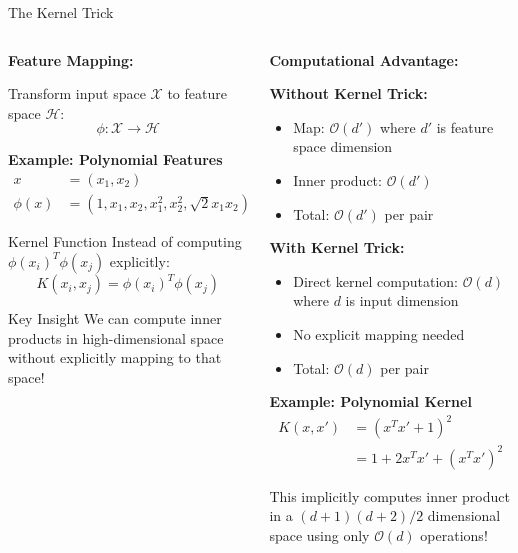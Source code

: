 \documentclass[8pt,aspectratio=1610]{beamer}
\begin{document}
\begin{frame}{The Kernel Trick}
\begin{columns}[t]
\begin{column}{0.48\textwidth}
\textbf{Feature Mapping:}
\vspace{0.2cm}

Transform input space $\mathcal{X}$ to feature space $\mathcal{H}$:
$$\phi: \mathcal{X} \rightarrow \mathcal{H}$$

\vspace{0.3cm}
\textbf{Example: Polynomial Features}
\begin{align}
x &= (x_1, x_2) \\
\phi(x) &= (1, x_1, x_2, x_1^2, x_2^2, \sqrt{2}x_1 x_2)
\end{align}

\vspace{0.3cm}
\begin{block}{Kernel Function}
Instead of computing $\phi(x_i)^T \phi(x_j)$ explicitly:
$$K(x_i, x_j) = \phi(x_i)^T \phi(x_j)$$
\end{block}

\vspace{0.3cm}
\begin{alertblock}{Key Insight}
We can compute inner products in high-dimensional space without explicitly mapping to that space!
\end{alertblock}
\end{column}

\begin{column}{0.48\textwidth}
\textbf{Computational Advantage:}
\vspace{0.2cm}

\textbf{Without Kernel Trick:}
\begin{itemize}
\setlength{\itemsep}{1pt}
\item Map: $\mathcal{O}(d')$ where $d'$ is feature space dimension
\item Inner product: $\mathcal{O}(d')$
\item Total: $\mathcal{O}(d')$ per pair
\end{itemize}

\vspace{0.3cm}
\textbf{With Kernel Trick:}
\begin{itemize}
\setlength{\itemsep}{1pt}
\item Direct kernel computation: $\mathcal{O}(d)$ where $d$ is input dimension
\item No explicit mapping needed
\item Total: $\mathcal{O}(d)$ per pair
\end{itemize}

\vspace{0.3cm}
\textbf{Example: Polynomial Kernel}
\begin{align}
K(x, x') &= (x^T x' + 1)^2 \\
&= 1 + 2x^T x' + (x^T x')^2
\end{align}

This implicitly computes inner product in a $(d+1)(d+2)/2$ dimensional space using only $\mathcal{O}(d)$ operations!
\end{column}
\end{columns}
\end{frame}
\end{document}
